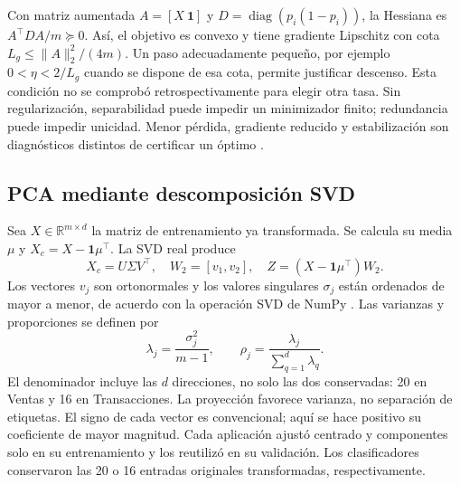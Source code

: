 Con matriz aumentada $A=[X\ \mathbf1]$ y $D=\operatorname{diag}(p_i(1-p_i))$, la Hessiana es $A^\top DA/m\succeq0$. Así, el objetivo es convexo y tiene gradiente Lipschitz con cota $L_g\leq\|A\|_2^2/(4m)$. Un paso adecuadamente pequeño, por ejemplo $0<\eta<2/L_g$ cuando se dispone de esa cota, permite justificar descenso. Esta condición no se comprobó retrospectivamente para elegir otra tasa. Sin regularización, separabilidad puede impedir un minimizador finito; redundancia puede impedir unicidad. Menor pérdida, gradiente reducido y estabilización son diagnósticos distintos de certificar un óptimo \cite{boyd}.

\subsection{PCA mediante descomposición SVD}
Sea $X\in\mathbb R^{m\times d}$ la matriz de entrenamiento ya transformada. Se calcula su media $\mu$ y $X_c=X-\mathbf1\mu^\top$. La SVD real produce
\begin{equation}X_c=U\Sigma V^\top,\quad W_2=[v_1,v_2],\quad Z=(X-\mathbf1\mu^\top)W_2.\label{eq:pca}\end{equation}
Los vectores $v_j$ son ortonormales y los valores singulares $\sigma_j$ están ordenados de mayor a menor, de acuerdo con la operación SVD de NumPy \cite{numpy}. Las varianzas y proporciones se definen por
\begin{equation}\lambda_j=\frac{\sigma_j^2}{m-1},\qquad \rho_j=\frac{\lambda_j}{\sum_{q=1}^{d}\lambda_q}.\end{equation}
El denominador incluye las $d$ direcciones, no solo las dos conservadas: 20 en Ventas y 16 en Transacciones. La proyección favorece varianza, no separación de etiquetas. El signo de cada vector es convencional; aquí se hace positivo su coeficiente de mayor magnitud. Cada aplicación ajustó centrado y componentes solo en su entrenamiento y los reutilizó en su validación. Los clasificadores conservaron las 20 o 16 entradas originales transformadas, respectivamente.

